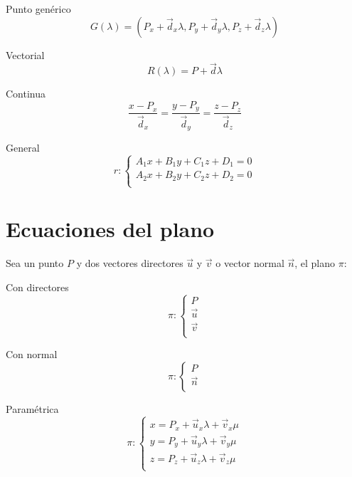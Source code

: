 \documentclass[12pt, letterpaper, twoside]{article}
\begin{document}
	Punto genérico
	\begin{equation}
		G(\lambda) = (P_x + \vec{d}_x \lambda, P_y + \vec{d}_y \lambda, P_z + \vec{d}_z \lambda)
	\end{equation}
	
	Vectorial
	\begin{equation}
		R(\lambda) = P + \vec{d} \lambda
	\end{equation}

	Continua
	\begin{equation}
		\frac{x - P_x}{\vec{d}_x} = \frac{y - P_y}{\vec{d}_y} = \frac{z - P_z}{\vec{d}_z}
	\end{equation}

	General
	\begin{equation}
		r :
		\begin{cases}
			A_1x + B_1y + C_1z + D_1 = 0 \\
			A_2x + B_2y + C_2z + D_2 = 0 \\
		\end{cases}
	\end{equation}


	\section{Ecuaciones del plano}
	
	Sea un punto $P$ y dos vectores directores $\vec{u}$ y $\vec{v}$ o vector normal $\vec{n}$, el plano $\pi$:
	
	Con directores
	\begin{equation}
		\pi : \begin{cases}
			P \\
			\vec{u} \\
			\vec{v} \\
		\end{cases}
	\end{equation}

	Con normal
	\begin{equation}
		\pi : \begin{cases}
			P \\
			\vec{n} \\
		\end{cases}
	\end{equation}

	Paramétrica
	\begin{equation}
		\pi :
		\begin{cases}
			x = P_x + \vec{u}_x \lambda + \vec{v}_x \mu \\
			y = P_y + \vec{u}_y \lambda + \vec{v}_y \mu \\
			z = P_z + \vec{u}_z \lambda + \vec{v}_z \mu \\
		\end{cases}
	\end{equation}
	
\end{document}
